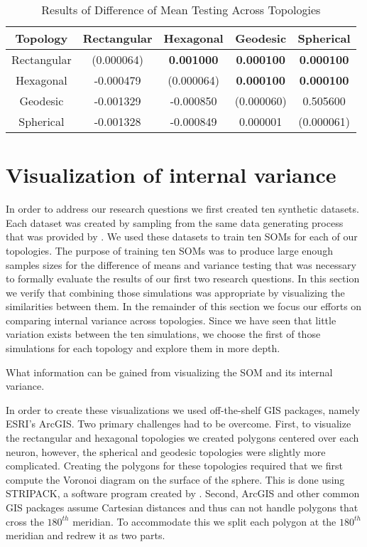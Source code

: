\begin{table}
  \begin{minipage}{\textwidth}
  \caption{Results of Difference of Mean Testing Across Topologies}
  \label{rlt:all}
  \begin{tabular}{|c||c|c|c|c|}
  \hline
  \textbf{Topology}&Rectangular	&Hexagonal &Geodesic &Spherical\\\hline
  \hline
   Rectangular & (0.000064) & \textbf{0.001000} & \textbf{0.000100} & \textbf{0.000100}\\\hline
   Hexagonal & -0.000479 & (0.000064) & \textbf{0.000100} & \textbf{0.000100}\\\hline
   Geodesic & -0.001329 & -0.000850 & (0.000060) & 0.505600\\\hline
   Spherical & -0.001328 & -0.000849 & 0.000001 & (0.000061)\\\hline

  \end{tabular}
  \end{minipage}
\end{table}



\section{Visualization of internal variance}
\label{rdq3}
In order to address our research questions we first created ten synthetic
datasets.  Each dataset was created by sampling from the same data generating process
that was provided by \cite{wu2006}.  We used these datasets to train ten
SOMs for each of our topologies.  The purpose of training ten SOMs was to
produce large enough samples sizes for the difference of means and variance
testing that was necessary to formally evaluate the results of our first two
research questions.  In this section we verify that combining those
simulations was appropriate by visualizing the similarities between them.
In the remainder of this section we focus our efforts on comparing internal
variance across
topologies.  Since we have seen that little variation exists between the ten
simulations, we choose the first of those simulations for each topology and
explore them in more depth.


What information can be gained from visualizing the SOM and its
internal variance. 

In order to create these visualizations we used off-the-shelf GIS packages,
namely ESRI's ArcGIS.  Two primary challenges had to be overcome. First, to
visualize the rectangular and hexagonal topologies we created polygons
centered over each neuron, however, the spherical and geodesic topologies were
slightly more complicated.  Creating the polygons for these topologies
required that we first compute the Voronoi diagram on the surface of the
sphere.  This is done using STRIPACK, a software program created by
\cite{Ranka97}.  Second, ArcGIS and other common GIS packages assume Cartesian
distances and thus can not handle polygons that cross the $180^{th}$ meridian.
To accommodate this we split each polygon at the $180^{th}$ meridian and
redrew it as two parts.

